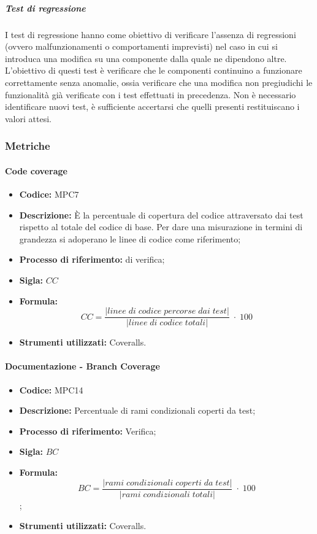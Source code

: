\subparagraph*{Test di regressione}
I test di regressione hanno come obiettivo di verificare l'assenza di regressioni (ovvero malfunzionamenti o comportamenti imprevisti) nel caso in cui si introduca una modifica su una componente dalla quale ne dipendono altre.
L'obiettivo di questi test è verificare che le componenti continuino a funzionare correttamente senza anomalie, ossia verificare che una modifica non pregiudichi le funzionalità già verificate con i test effettuati in precedenza.
Non è necessario identificare nuovi test, è sufficiente accertarsi che quelli presenti restituiscano i valori attesi.


\subsubsection{Metriche}

\paragraph{Code coverage}
\begin{itemize}
	\item \textbf{Codice:} MPC7
	\item \textbf{Descrizione:} È la percentuale di copertura del codice attraversato dai test rispetto al totale del codice di base. Per dare una misurazione in termini di grandezza si adoperano le linee di codice come riferimento;
	\item \textbf{Processo di riferimento:}  di verifica;
	\item \textbf{Sigla:} $CC$
	\item \textbf{Formula:} $$CC = \frac{|linee \; di \; codice \; percorse \; dai  \; test|}{|linee \; di \; codice \; totali|} \; \cdot \; 100$$
	\item \textbf{Strumenti utilizzati:} Coveralls.
\end{itemize}

\paragraph{Documentazione - Branch Coverage}
\begin{itemize}
    \item \textbf{Codice:} MPC14
    \item \textbf{Descrizione:} Percentuale di rami condizionali coperti da test;
    \item \textbf{Processo di riferimento:} Verifica;
    \item \textbf{Sigla:} $BC$
    \item \textbf{Formula:} $$BC = \frac{|rami \; condizionali \; coperti \; da \; test|}{|rami \; condizionali \; totali|} \; \cdot \; 100$$;
    \item \textbf{Strumenti utilizzati:} Coveralls.
\end{itemize}

